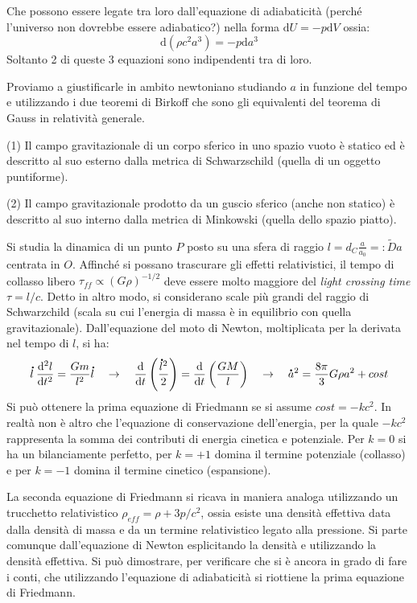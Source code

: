 Che possono essere legate tra loro dall'equazione di adiabaticità (perché l'universo non dovrebbe essere adiabatico?) nella forma $\mathrm{d}U=-p\mathrm{d}V$ ossia:
\begin{equation}
    \mathrm{d}(\rho c^2 a^3)=-p\mathrm{d}a^3
\end{equation}
Soltanto 2 di queste 3 equazioni sono indipendenti tra di loro.

\vspace{1em}
Proviamo a giustificarle in ambito newtoniano studiando $a$ in funzione del tempo e utilizzando i due teoremi di Birkoff che sono gli equivalenti del teorema di Gauss in relatività generale.
\begin{theorem}
(1) Il campo gravitazionale di un corpo sferico in uno spazio vuoto è statico ed è descritto al suo esterno dalla metrica di Schwarzschild (quella di un oggetto puntiforme).

(2) Il campo gravitazionale prodotto da un guscio sferico (anche non statico) è descritto al suo interno dalla metrica di Minkowski (quella dello spazio piatto).
\end{theorem}

Si studia la dinamica di un punto $P$ posto su una sfera di raggio $l=d_C \frac{a}{a_0}=:\tilde{D}a$ centrata in $O$. Affinché si possano trascurare gli effetti relativistici, il tempo di collasso libero $\tau_{ff}\propto (G\rho)^{-1/2}$ deve essere molto maggiore del \textit{light crossing time} $\tau =l / c$. Detto in altro modo, si considerano scale più grandi del raggio di Schwarzchild (scala su cui l'energia di massa è in equilibrio con quella gravitazionale). Dall'equazione del moto di Newton, moltiplicata per la derivata nel tempo di $l$, si ha:
$$
\accentset{\mbox{\large\bfseries .}}{l}\:\frac{\mathrm{d^2} l}{\mathrm{d} t^2}=\frac{Gm}{l^2}\accentset{\mbox{\large\bfseries .}}{l} \quad \rightarrow \quad \frac{\mathrm{d} }{\mathrm{d} t}\left ( \frac{\accentset{\mbox{\large\bfseries .}}{l}^2}{2} \right )=\frac{\mathrm{d} }{\mathrm{d} t}\left ( \frac{GM}{l} \right ) \quad \rightarrow \quad \accentset{\mbox{\large\bfseries .}}{a}^2 =\frac{8\pi}{3}G\rho a^2+cost
$$
Si può ottenere la prima equazione di Friedmann se si assume $cost=-kc^2$. In realtà non è altro che l'equazione di conservazione dell'energia, per la quale $-kc^2$ rappresenta la somma dei contributi di energia cinetica e potenziale. Per $k=0$ si ha un bilanciamente perfetto, per $k=+1$ domina il termine potenziale (collasso) e per $k=-1$ domina il termine cinetico (espansione).

La seconda equazione di Friedmann si ricava in maniera analoga utilizzando un trucchetto relativistico $\rho_{eff}=\rho+3p/c^2$, ossia esiste una densità effettiva data dalla densità di massa e da un termine relativistico legato alla pressione. Si parte comunque dall'equazione di Newton esplicitando la densità e utilizzando la densità effettiva.
Si può dimostrare, per verificare che si è ancora in grado di fare i conti, che utilizzando l'equazione di adiabaticità si riottiene la prima equazione di Friedmann.


